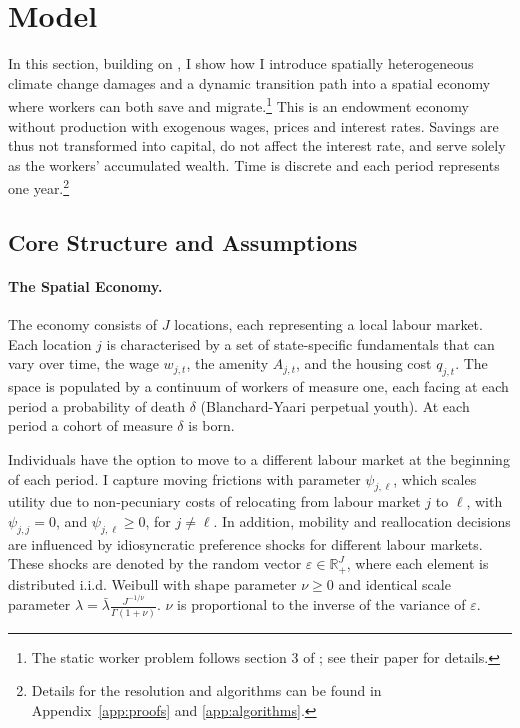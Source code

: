\documentclass[11pt, a4paper]{article}
\begin{document}
\section{Model}
\label{sec:model}
In this section, building on \citet{dvorkin_geography_2025}, I show how I introduce spatially heterogeneous climate change damages and a dynamic transition path into a spatial economy where workers can both save and migrate.\footnote{The static worker problem follows section 3 of \citet{dvorkin_geography_2025}; see their paper for details.} This is an endowment economy without production with exogenous wages, prices and interest rates. Savings are thus not transformed into capital, do not affect the interest rate, and serve solely as the workers' accumulated wealth. Time is discrete and each period represents one year.\footnote{Details for the resolution and algorithms can be found in Appendix~\ref{app:proofs} and \ref{app:algorithms}.}

\subsection{Core Structure and Assumptions}
\paragraph{The Spatial Economy.} The economy consists of $J$ locations, each representing a local labour market. Each location $j$ is characterised by a set of state-specific fundamentals that can vary over time, the wage $w_{j,t}$, the amenity $A_{j,t}$, and the housing cost $q_{j,t}$. The space is populated by a continuum of workers of measure one, each facing at each period a probability of death $\delta$ (Blanchard-Yaari perpetual youth). At each period a cohort of measure $\delta$ is born. 

Individuals have the option to move to a different labour market at the beginning of each period. I capture moving frictions with parameter $\psi_{j,\ell}$, which scales utility due to non-pecuniary costs of relocating from labour market $j$ to $\ell$, with  $\psi_{j,j} = 0$, and  $\psi_{j,\ell} \geq 0$, for $j \neq \ell$. In addition, mobility and reallocation decisions are influenced by idiosyncratic preference shocks for different labour markets. These shocks are denoted by the random vector $\varepsilon \in \mathbb{R}^J_+$, where each element is distributed i.i.d. Weibull with shape parameter $\nu \geq 0$ and identical scale parameter $\lambda = \bar{\lambda}\frac{J^{-1/\nu}}{\Gamma(1+\nu)}$. $\nu$ is proportional to the inverse of the variance of $\varepsilon$.
\end{document}
